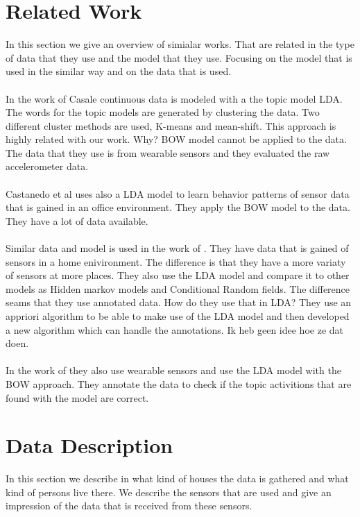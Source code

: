\documentclass[11pt,a4paper]{article}
\begin{document}
\section{Related Work}
In this section we give an overview of simialar works. That are related in the type of data that they use and the model that they use.
Focusing on the model that is used in the similar way and on the data that is used.\\
\\
In the work of Casale \cite{Casale:2009} continuous data is modeled with a the topic model LDA. The words for the topic models are generated by clustering the data. Two different cluster methods are used, K-means and mean-shift. This approach is highly related with our work. Why? BOW model cannot be applied to the data. The data that they use is from wearable sensors and they evaluated the raw accelerometer data.\\
\\
Castanedo et al \cite{EXSY:EXSY12033} uses also a LDA model to learn behavior patterns of sensor data that is gained in an office environment. They apply the BOW model to the data. They have a lot of data available.\\
\\
Similar data and model is used in the work of \cite{journals/percom/ChikhaouiWP12}. They have data that is gained of sensors in a home enivironment. The difference is that they have a more variaty of sensors at more places. They also use the LDA model and compare it to other models as Hidden markov models and Conditional Random fields. The difference seams that they use annotated data. How do they use that in LDA?
They use an appriori algorithm to be able to make use of the LDA model and then developed a new algorithm which can handle the annotations. Ik heb geen idee hoe ze dat doen.\\
\\
In the work of \cite{} they also use wearable sensors and use the LDA model with the BOW approach. They annotate the data to check if the topic activitions that are found with the model are correct.




\pagebreak


\section{Data Description}
\label{sec:DataDesc}
In this section we describe in what kind of houses the data is gathered and what kind of persons live there. We describe the sensors that are used and give an impression of the data that is received from these sensors.
\end{document}
